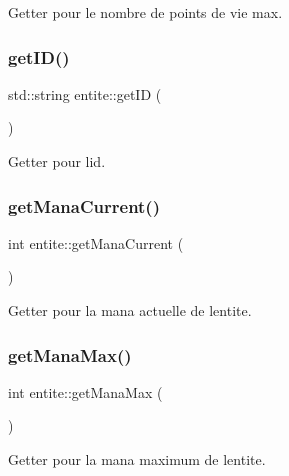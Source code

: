 Getter pour le nombre de points de vie max. 

\mbox{\label{classentite_a3af765474e7f288752f24334d0fc6bbd}} 
\subsubsection{\texorpdfstring{get\+I\+D()}{getID()}}
{\footnotesize\ttfamily std\+::string entite\+::get\+ID (\begin{DoxyParamCaption}{ }\end{DoxyParamCaption})}



Getter pour l\textquotesingle{}id. 

\mbox{\label{classentite_ad3e7a419d79d7d7e836243c4920703e3}} 
\subsubsection{\texorpdfstring{get\+Mana\+Current()}{getManaCurrent()}}
{\footnotesize\ttfamily int entite\+::get\+Mana\+Current (\begin{DoxyParamCaption}{ }\end{DoxyParamCaption})}



Getter pour la mana actuelle de l\textquotesingle{}entite. 

\mbox{\label{classentite_a427218420d74bdec1f79f93572ecf24a}} 
\subsubsection{\texorpdfstring{get\+Mana\+Max()}{getManaMax()}}
{\footnotesize\ttfamily int entite\+::get\+Mana\+Max (\begin{DoxyParamCaption}{ }\end{DoxyParamCaption})}



Getter pour la mana maximum de l\textquotesingle{}entite. 

\mbox{\label{classentite_a0ebd43d682f234a39faa04bb34173d03}} 
